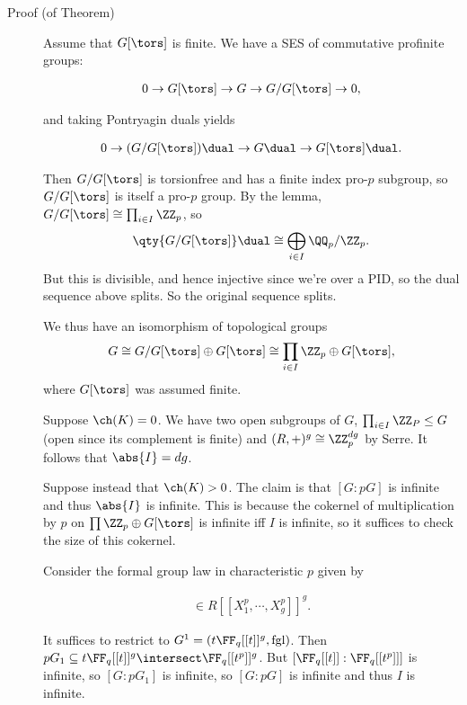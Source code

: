\begin{description}
\item[Proof (of Theorem)]
Assume that \(G[\tors]\) is finite. We have a SES of commutative
profinite groups:

\begin{align*}
0 \to G[\tors] \to G \to G/G[\tors] \to 0
,\end{align*}

and taking Pontryagin duals yields

\begin{align*}
0 \to (G/G[\tors])\dual \to G\dual \to G[\tors]\dual
.\end{align*}

Then \(G/G[\tors]\) is torsionfree and has a finite index pro-\(p\)
subgroup, so \(G/G[\tors]\) is itself a pro-\(p\) group. By the lemma,
\(G/G[\tors] \cong \prod_{i\in I} \ZZ_p\), so
\begin{align*}
\qty{G/G[\tors]}\dual \cong \bigoplus_{i\in I} \QQ_p/\ZZ_p
.\end{align*} But this is divisible, and hence injective since we're
over a PID, so the dual sequence above splits. So the original sequence
splits.

We thus have an isomorphism of topological groups
\begin{align*}
G \cong G/G[\tors] \oplus G[\tors] \cong \prod_{i\in I} \ZZ_p \oplus G[\tors]
,\end{align*} where \(G[\tors]\) was assumed finite.

Suppose \(\ch(K) = 0\). We have two open subgroups of \(G\),
\(\prod_{i\in I} \ZZ_P \leq G\) (open since its complement is finite)
and \((R, +)^g \cong \ZZ_p^{dg}\) by Serre. It follows that
\(\abs{I} = dg\).

Suppose instead that \(\ch(K) > 0\). The claim is that \([G: pG]\) is
infinite and thus \(\abs{I}\) is infinite. This is because the cokernel
of multiplication by \(p\) on \(\prod \ZZ_p \oplus G[\tors]\) is
infinite iff \(I\) is infinite, so it suffices to check the size of this
cokernel.

Consider the formal group law in characteristic \(p\) given by

\begin{align*}
[p] \in R[[X_1^p, \cdots, X_g^p]]^g
.\end{align*}

It suffices to restrict to \(G^1 = (t \FF_q[[t]]^g, \text{fgl} )\). Then
\(pG_1 \subseteq t \FF_q[[t]]^g \intersect \FF_q[[t^p]]^g\). But
\([\FF_q[[t]]: \FF_q[[t^p]] ]\) is infinite, so \([G: pG_1]\) is
infinite, so \([G: pG]\) is infinite and thus \(I\) is infinite.
\end{description}


